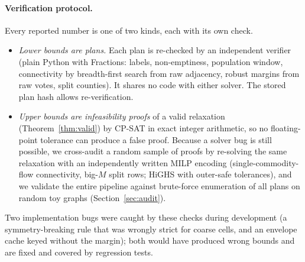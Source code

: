 \paragraph{Verification protocol.}
Every reported number is one of two kinds, each with its own check.
\begin{itemize}[leftmargin=*]
\item \emph{Lower bounds are plans.} Each plan is re-checked by an independent verifier (plain Python with Fractions: labels, non-emptiness, population window, connectivity by breadth-first search from raw adjacency, robust margins from raw votes, split counties). It shares no code with either solver. The stored plan hash allows re-verification.
\item \emph{Upper bounds are infeasibility proofs} of a valid relaxation (Theorem~\ref{thm:valid}) by CP-SAT in exact integer arithmetic, so no floating-point tolerance can produce a false proof. Because a solver bug is still possible, we cross-audit a random sample of proofs by re-solving the same relaxation with an independently written MILP encoding (single-commodity-flow connectivity, big-$M$ split rows; HiGHS with outer-safe tolerances), and we validate the entire pipeline against brute-force enumeration of all plans on random toy graphs (Section~\ref{sec:audit}).
\end{itemize}
Two implementation bugs were caught by these checks during development (a symmetry-breaking rule that was wrongly strict for coarse cells, and an envelope cache keyed without the margin); both would have produced wrong bounds and are fixed and covered by regression tests.
